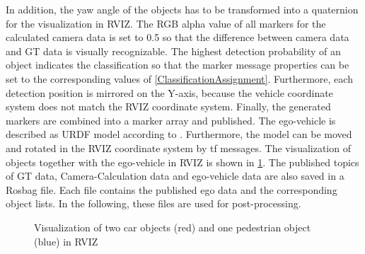 In addition, the yaw angle of the objects has to be transformed into a quaternion for the visualization in \ac{RVIZ}. The RGB alpha value of all markers for the calculated camera data is set to 0.5 so that the difference between camera data and GT data is visually recognizable. 
The highest detection probability of an object indicates the classification so that the marker message properties can be set to the corresponding values of \cref{ClassificationAssignment}. Furthermore, each detection position is mirrored on the Y-axis, because the vehicle coordinate system does not match the \ac{RVIZ} coordinate system. Finally, the generated markers are combined into a marker array and published.
The ego-vehicle is described as URDF model according to \cite{URDF}.
Furthermore, the model can be moved and rotated in the \ac{RVIZ} coordinate system by tf messages. The visualization of objects together with the ego-vehicle in \ac{RVIZ} is shown in \cref{fig:RVIZ}.
The published topics of \ac{GT} data, Camera-Calculation data and ego-vehicle data are also saved in a Rosbag file. Each file contains the published ego data and the corresponding object lists. In the following, these files are used for post-processing.

\begin{figure}[b]
	\centering
	\caption{Visualization of two car objects (red) and one pedestrian object (blue) in RVIZ}
	\label{fig:RVIZ}
\end{figure}